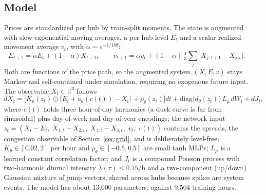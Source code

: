 \documentclass[11pt]{article}
\begin{document}
\subsection{Model}
Prices are standardized per hub by train-split moments. The state is
augmented with slow exponential moving averages, a per-hub level $E_t$ and
a scalar realized-movement average $v_t$, with $\alpha = e^{-1/168}$:
\begin{equation}
E_{t+1} = \alpha E_t + (1-\alpha) X_{t+1}, \qquad
v_{t+1} = \alpha v_t + (1-\alpha)\,\tfrac13 \textstyle\sum_j
\big|X_{j,t+1} - X_{j,t}\big| .
\label{eq:ema}
\end{equation}
Both are functions of the price path, so the augmented system
$(X, E, v)$ stays Markov and self-contained under simulation, requiring no
exogenous future input. The
observable $X_t \in \mathbb{R}^3$ follows
\begin{equation}
dX_t = \Big[K_\theta(z_t)\odot\big(E_t + a_\theta(c(t)) - X_t\big) +
\rho_\theta(z_t)\Big]dt
+ \mathrm{diag}\big(d_\theta(z_t)\big)\,L_\rho\, dW_t + dJ_t,
\label{eq:sde}
\end{equation}
where $c(t)$ holds three hour-of-day harmonics (a duck curve is far from
sinusoidal) plus day-of-week and day-of-year encodings; the network input
$z_t = (X_t - E_t,\; X_{1,t}-X_{2,t},\; X_{1,t}-X_{3,t},\; v_t,\; c(t))$
contains the spreads, the congestion observable of Section~\ref{sec:grid}, and is
deliberately level-free; $K_\theta \in [0.02, 2]$ per hour and
$\rho_\theta \in [-0.5, 0.5]$ are small tanh MLPs; $L_\rho$ is a learned
constant correlation factor; and $J_t$ is a compound Poisson process
with two-harmonic diurnal intensity
$\lambda(\tau) \le 0.15/$h and a
two-component (up/down) Gaussian mixture of jump vectors, shared across
hubs because spikes are system events. The model has about 13{,}000
parameters, against 9{,}504 training hours.
\end{document}

